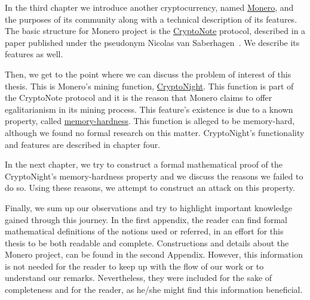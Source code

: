 In the third chapter we introduce another cryptocurrency, named \hyperref[sec:Monero]{Monero}, and the purposes of its community along with a technical description of its features. The basic structure for Monero project is the \hyperref[sec:CryptoNote]{CryptoNote} protocol, described in a paper published under the pseudonym Nicolas van Saberhagen~\cite{citeulike:14139412}. We describe its features as well.

Then, we get to the point where we can discuss the problem of interest of this thesis. This is Monero's mining function, \hyperref[ch:cryptonight]{CryptoNight}. This function is part of the CryptoNote protocol and it is the reason that Monero claims to offer egalitarianism in its mining process. This feature's existence is due to a known property, called \hyperref[sec:memory-hard]{memory-hardness}. This function is alleged to be memory-hard, although we found no formal research on this matter. CryptoNight's functionality and features are described in chapter four.

In the next chapter, we try to construct a formal mathematical proof of the CryptoNight's memory-hardness property and we discuss the reasons we failed to do so. Using these reasons, we attempt to construct an attack on this property.

Finally, we sum up our observations and try to highlight important knowledge gained through this journey. In the first appendix, the reader can find formal mathematical definitions of the notions used or referred, in an effort for this thesis to be both readable and complete. Constructions and details about the Monero project, can be found in the second Appendix. However, this information is not needed for the reader to keep up with the flow of our work or to understand our remarks. Nevertheless, they were included for the sake of completeness and for the reader, as he/she might find this information beneficial.
